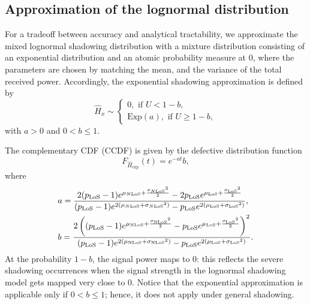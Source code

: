 \documentclass[conference]{IEEEtran}
\theoremstyle{definition}
\theoremstyle{plain}
\begin{document}
            \subsection{Approximation of the lognormal distribution}
             For a tradeoff between accuracy and analytical tractability, we approximate the mixed lognormal shadowing distribution with a mixture distribution consisting of an exponential distribution and an atomic probability measure at $0$, where the parameters are chosen by matching the mean, and the variance of the total received power.
             Accordingly, the exponential shadowing approximation is defined by
             \begin{equation}
               \hat{H}_x \sim
            \begin{cases}
               0, \text{ if } U < 1-b,\\
                \text{Exp}(a), \text{ if } U \geq1- b,              \label{eq:tier2exponential}
            \end{cases}
            \end{equation}
             with $a>0$ and $0<b\leq1$.


            The complementary CDF (CCDF) is given by the defective distribution function
            \begin{equation}
              \label{eq:defexp}
              F_{\hat{H}_{\text{exp}}}(t)=e^{-at}b,
            \end{equation}
            where
            \begin{align}
              &a=\frac{2 (p_{\text{LoS}}-1) e^{{\mu_{N\text{LoS}}}+\frac{{\sigma_{N\text{LoS}}}^2}{2}}-2 p_{\text{LoS}} e^{{\mu_{\text{LoS}}}+\frac{{\sigma_{\text{LoS}}}^2}{2}}}{(p_{\text{LoS}}-1) e^{2 \left({\mu_{N\text{LoS}}}+{\sigma_{N\text{LoS}}}^2\right)}-p_{\text{LoS}} e^{2 \left({\mu_{\text{LoS}}}+{\sigma_{\text{LoS}}}^2\right)}},\\
              &b=\frac{2 \left(({p_\text{LoS}}-1) e^{{\mu_{\text{N\text{LoS}}}}+\frac{{\sigma_{\text{N\text{LoS}}}}^2}{2}}-{p_\text{LoS}} e^{{\mu_{\text{LoS}}}+\frac{{\sigma_{\text{LoS}}}^2}{2}}\right)^2}{({p_\text{LoS}}-1) e^{2 \left({\mu_{\text{N\text{LoS}}}}+{\sigma_{\text{N\text{LoS}}}}^2\right)}-{p_\text{LoS}} e^{2 \left({\mu_{\text{LoS}}}+{\sigma_{\text{LoS}}}^2\right)}}.              
            \end{align} 
            At the probability $1-b$, the signal power maps to $0$: this reflects the severe shadowing occurrences when the signal strength in the lognormal shadowing model gets mapped very close to $0$. Notice that the exponential approximation is applicable only if $0<b\leq 1$; hence, it does not apply under general shadowing.
\end{document}
